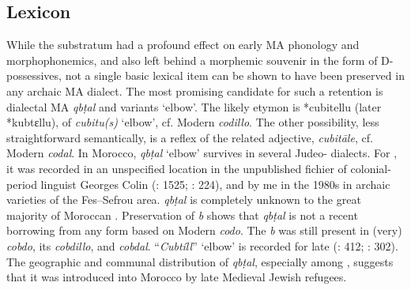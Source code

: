 \documentclass[output=paper]{langsci/langscibook}
\begin{document}
\subsection{Lexicon}

While the  substratum had a profound effect on early MA phonology and morphophonemics, and also left behind a morphemic souvenir in the form of D-possessives, not a single basic  lexical item can be shown to have been preserved in any archaic MA dialect. The most promising candidate for such a retention is dialectal MA \textit{qbṭal} and variants ‘elbow’. The likely etymon is  *cubitellu (later  *kubtɛllu),  of  \textit{cubitu(s)} ‘elbow’, cf. Modern  \textit{codillo}. The other possibility, less straightforward semantically, is a reflex of the related adjective,  \textit{cubitāle}, cf. Modern  \textit{codal}. In Morocco, \textit{qbṭal} ‘elbow’ survives in several Judeo- dialects. For , it was recorded in an unspecified location in the unpublished fichier of colonial-period linguist Georges Colin (\citealt{IraquiSinaceur1993}: 1525; \citealt{Prémare1998}: 224), and by me in the 1980s in archaic varieties of the Fes--Sefrou area. \textit{qbṭal} is completely unknown to the great majority of Moroccan . Preservation of \textit{b} shows that \textit{qbṭal} is not a recent borrowing from any form based on Modern  \textit{codo}. The \textit{b} was still present in (very)  \textit{cobdo}, its  \textit{cobdillo}, and \textit{cobdal}. “\textit{Cubtíll}” ‘elbow’ is recorded for late   (\citealt{Corriente1997dictionary}: 412; \citealt{Dozy1967}: 302). The geographic and communal distribution of \textit{qbṭal}, especially among , suggests that it was introduced into Morocco by late Medieval Jewish refugees. 
\end{document}
